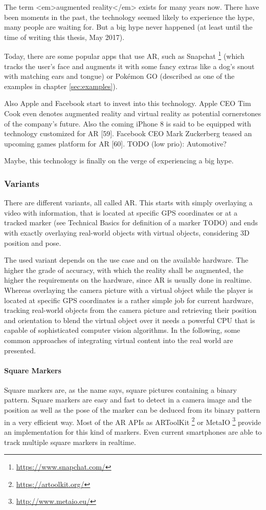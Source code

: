 The term <em>augmented reality</em> exists for many years now. There have been moments in the past, the technology seemed likely to experience the hype, many people are waiting for. But a big hype never happened (at least until the time of writing this thesis, May 2017).

Today, there are some popular apps that use AR, such as Snapchat \footnote{\url{https://www.snapchat.com/}} (which tracks the user's face and augments it with some fancy extras like a dog's snout with matching ears and tongue) or Pokémon GO (described as one of the examples in chapter \ref{sec:examples}).

Also Apple and Facebook start to invest into this technology. Apple CEO Tim Cook even denotes augmented reality and virtual reality as potential cornerstones of the company's future. Also the coming iPhone 8 is said to be equipped with technology customized for AR [59]. Facebook CEO Mark Zuckerberg teased an upcoming games platform for AR [60]. TODO (low prio): Automotive?

Maybe, this technology is finally on the verge of experiencing a big hype.

\subsubsection{Variants}
There are different variants, all called AR. This starts with simply overlaying a video with information, that is located at specific GPS coordinates or at a tracked marker (see Technical Basics for definition of a marker TODO) and ends with exactly overlaying real-world objects with virtual objects, considering 3D position and pose.

The used variant depends on the use case and on the available hardware. The higher the grade of accuracy, with which the reality shall be augmented, the higher the requirements on the hardware, since AR is usually done in realtime. Whereas overlaying the camera picture with a virtual object while the player is located at specific GPS coordinates is a rather simple job for current hardware, tracking real-world objects from the camera picture and retrieving their position and orientation to blend the virtual object over it needs a powerful CPU that is capable of sophisticated computer vision algorithms. In the following, some common approaches of integrating virtual content into the real world are presented.

\paragraph{Square Markers}
Square markers are, as the name says, square pictures containing a binary pattern. Square markers are easy and fast to detect in a camera image and the position as well as the pose of the marker can be deduced from its binary pattern in a very efficient way. Most of the AR APIs as ARToolKit \footnote{\url{https://artoolkit.org/}} or MetaIO \footnote{\url{http://www.metaio.eu/}} provide an implementation for this kind of markers. Even current smartphones are able to track multiple square markers in realtime.

